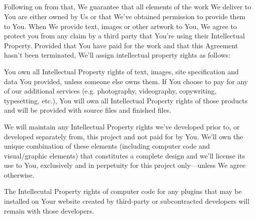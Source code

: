 {  \subsection{}
  Following on from that, We guarantee that all elements of the work We deliver to You are either owned by Us or that We’ve obtained permission to provide them to You. When We provide text, images or other artwork to You, We agree to protect you from any claim by a third party that You’re using their Intellectual Property. Provided that You have paid for the work and that this Agreement hasn’t been terminated, We’ll assign intellectual property rights as follows:
    \begin{longenum}
      \item You own all Intellectual Property rights of text, images, site specification and data You provided, unless someone else owns them. If You choose to pay for any of our additional services (e.g. photography, videography, copywriting, \latex typesetting, etc.), You will own all Intellectual Property rights of those products and will be provided with source files and finished files.
      \item We will maintain any Intellectual Property rights we’ve developed prior to, or developed separately from, this project and not paid for by You. We’ll own the unique combination of these elements (including computer code and visual/graphic elements) that constitutes a complete design and we’ll license its use to You, exclusively and in perpetuity for this project only—unless We agree otherwise.
      \item The Intellecutal Property rights of computer code for any plugins that may be installed on Your website created by third-party or subcontracted developers will remain with those developers.
    \end{longenum}
}
\newcommand{\securityobligations}{
    \section{Security Obligations}
    We agree to hold and maintain Confidential Information in the strictest confidence for the benefit of You. You agree to do the same for the benefit of Us. We shall carefully restrict access to Confidential Information and PII to Our employees, contractors, and third parties as may reasonably be required on a need-to-know basis and We will require those people to agree to non disclosure restrictions at least as protective as those in this Agreement.
}

